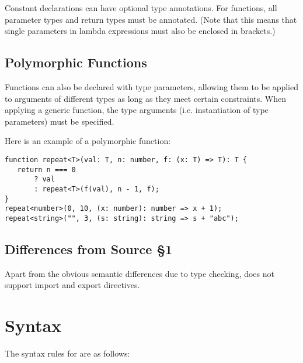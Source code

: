 Constant declarations can have optional type annotations. 
For functions, all parameter types and return types must be annotated.
(Note that this means that single parameters in lambda expressions must also be enclosed in brackets.)

\subsection{Polymorphic Functions}

Functions can also be declared with type parameters, allowing them to be applied to arguments of different types as long as they meet certain constraints.
When applying a generic function, the type arguments (i.e. instantiation of type parameters) must be specified.

Here is an example of a polymorphic function:
\begin{verbatim}
function repeat<T>(val: T, n: number, f: (x: T) => T): T {
   return n === 0
       ? val
       : repeat<T>(f(val), n - 1, f);
}
repeat<number>(0, 10, (x: number): number => x + 1);
repeat<string>("", 3, (s: string): string => s + "abc");
\end{verbatim}

\subsection{Differences from Source \S 1}

Apart from the obvious semantic differences due to type checking, \DynamicTS{} does not support import and export directives.


\section{Syntax}

The syntax rules for \DynamicTS{} are as follows:

